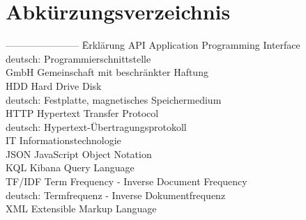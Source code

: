 \documentclass[a4paper]{scrartcl}
\begin{document}
\thispagestyle{empty}




\newpage


\setcounter{page}{2}

\tableofcontents



\newpage

\section*{Abkürzungsverzeichnis}


\begin{tabbing}
	----------------------- \= Erklärung \kill
	API \> Application Programming Interface \\
	\> deutsch: Programmierschnittstelle \\
	GmbH \> Gemeinschaft mit beschränkter Haftung \\
	HDD \> Hard Drive Disk \\
	\> deutsch: Festplatte, magnetisches Speichermedium  \\
	HTTP \> Hypertext Transfer Protocol \\
	\> deutsch: Hypertext-Übertragungsprotokoll \\
	IT \> Informationstechnologie \\
	JSON \> JavaScript Object Notation \\
	KQL \> Kibana Query Language \\
	TF/IDF \> Term Frequency - Inverse Document Frequency \\
	\> deutsch: Termfrequenz - Inverse Dokumentfrequenz \\
	XML \> Extensible Markup Language \\
\end{tabbing}


\newpage

\listoffigures


\newpage
\end{document}
